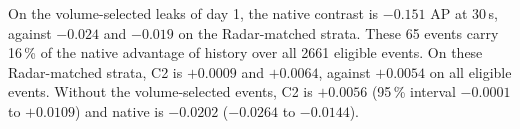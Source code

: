 On the volume-selected leaks of day 1, the native contrast is $-0.151$ AP at 30\,s, against $-0.024$ and $-0.019$ on the Radar-matched strata.
These 65 events carry 16\,\% of the native advantage of history over all \num{2661} eligible events.
On these Radar-matched strata, C2 is $+0.0009$ and $+0.0064$, against $+0.0054$ on all eligible events.
Without the volume-selected events, C2 is $+0.0056$ (95\,\% interval $-0.0001$ to $+0.0109$) and native is $-0.0202$ ($-0.0264$ to $-0.0144$).
